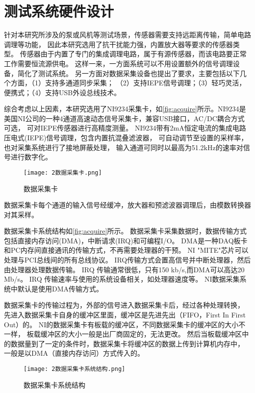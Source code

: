 \section{测试系统硬件设计}
针对本研究所涉及的泵或风机等测试场景，传感器需要支持远距离传输，简单电路调理等功能，
因此本研究选用了抗干扰能力强，内置放大器等要求的传感器类型。
传感器由于内置了专门的集成调理电路，属于有源传感器，而该电路要正常工作需要恒流源供电。
这样一来，一方面系统可以不用设置额外的信号调理设备，简化了测试系统。
另一方面对数据采集设备也提出了要求，主要包括以下几个方面，（1）支持多通道同步采集；
（2）支持IEPE信号调理；（3）轻巧灵活，便携式；（4）支持USB外设总线技术。

综合考虑以上因素，本研究选用了​NI9234采集卡，如\autoref{fig:acquire}所示。
​NI9234是美国NI公司的一种4通道高速动态信号采集卡，兼容USB接口，AC/DC耦合方式可选，
可对IEPE传感器进行高精度测量。
NI9234带有2mA恒定电流的集成电路压电式(IEPE)信号调理，包含内置抗混叠滤波器，
可自动调节至设置的采样率，也对采集系统进行了接地屏蔽处理，
输入通道可同时以最高为51.2$\mathrm{kHz}$的速率对信号进行数字化。
\begin{figure}[htbp]
    \centering
    \texttt{[image: 2数据采集卡.png]}
    \caption{\label{fig:acquire}数据采集卡}
\end{figure}
​
数据采集卡每个通道的输入信号经缓冲，放大器和预滤波器调理后，由模数转换器对其采样。

数据采集卡系统结构如\autoref{fig:acquire}所示。
数据采集卡采集数据时，数据传输方式包括直接内存访问(DMA)，中断请求(IRQ)和可编程I/O。
DMA是一种DAQ板卡和PC内存间直接通讯的传输方式，不再需要处理器的干预。
NI "MITE"芯片可以处理与PCI总线间的所有总线协议。
IRQ传输方式会置高信号并中断处理器，然后由处理器处理数据传输。
IRQ  传输通常很低，只有150 kb/s,而DMA可以高达20 Mb/s。
IRQ 传输速率与使用的系统设备相关，如处理器速度等。
NI数据采集系统中默认是使用DMA传输方式。

数据采集卡的传输过程为，外部的信号进入数据采集卡后，经过各种处理转换，
先进入数据采集卡自身的缓冲区里面，缓冲区是先进先出（FIFO，First In First Out）的。
NI的数据采集卡有板载的缓冲区，不同数据采集卡的缓冲区的大小不一样，
板载缓冲区的大小一般是出厂商固定的，无法更改。
然后当板载缓冲区中的数据量到了一定的条件时，数据采集卡将缓冲区的数据上传到计算机内存中，
一般是以DMA（直接内存访问）方式传入的。

\begin{figure}[htbp]
    \centering
    \texttt{[image: 2数据采集卡系统结构.png]}
    \caption{\label{fig:acquire}数据采集卡系统结构}
\end{figure}

